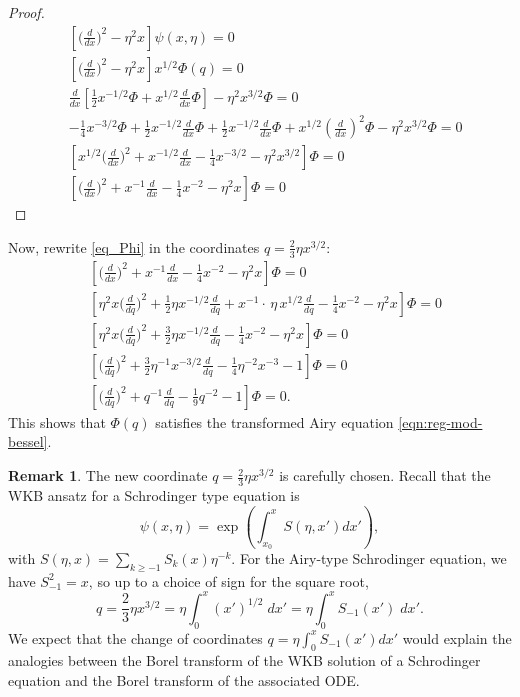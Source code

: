 \documentclass{article}
\theoremstyle{definition}
\newtheorem{remark}[definition]{Remark}
\theoremstyle{plain}
\begin{document}
\begin{proof}
\begin{align*}
&\left[\big(\tfrac{d}{dx}\big)^2 - \eta^2 x \right] \psi(x, \eta) = 0\\
&\left[\big(\tfrac{d}{dx}\big)^2 - \eta^2 x \right] x^{1/2}\Phi(q) = 0\\
&\frac{d}{dx}\left[\tfrac{1}{2}x^{-1/2}\Phi+x^{1/2}\tfrac{d}{dx}\Phi\right]-\eta^2x^{3/2}\Phi=0\\
&-\tfrac{1}{4}x^{-3/2}\Phi+\tfrac{1}{2}x^{-1/2}\tfrac{d}{dx}\Phi+\tfrac{1}{2}x^{-1/2}\tfrac{d}{dx}\Phi+x^{1/2}\left(\tfrac{d}{dx}\right)^2\Phi-\eta^2x^{3/2}\Phi=0\\
&\left[x^{1/2}\big(\tfrac{d}{dx}\big)^2+x^{-1/2}\tfrac{d}{dx}-\tfrac{1}{4}x^{-3/2}-\eta^2x^{3/2}\right]\Phi=0\\
&\left[\big(\tfrac{d}{dx}\big)^2+x^{-1}\tfrac{d}{dx}-\tfrac{1}{4}x^{-2}-\eta^2x\right]\Phi=0
\end{align*}
\end{proof}
Now, rewrite \eqref{eq_Phi} in the coordinates $q=\frac{2}{3}\eta x^{3/2}$: 
\begin{align*}
&\left[\big(\tfrac{d}{dx}\big)^2+x^{-1}\tfrac{d}{dx}-\tfrac{1}{4}x^{-2}-\eta^2x\right]\Phi=0\\
&\left[\eta^2x\big(\tfrac{d}{dq}\big)^2+\frac{1}{2}\eta x^{-1/2}\tfrac{d}{dq}+x^{-1}\cdot\, \eta\,  x^{1/2}\tfrac{d}{dq}-\tfrac{1}{4}x^{-2}-\eta^2x\right]\Phi=0\\
&\left[\eta^2x\big(\tfrac{d}{dq}\big)^2+\tfrac{3}{2}\eta x^{-1/2}\tfrac{d}{dq}-\tfrac{1}{4}x^{-2}-\eta^2x\right]\Phi=0\\
&\left[\big(\tfrac{d}{dq}\big)^2+\tfrac{3}{2}\eta^{-1} x^{-3/2}\tfrac{d}{dq}-\tfrac{1}{4}\eta^{-2}x^{-3}-1\right]\Phi=0\\
&\left[\big(\tfrac{d}{dq}\big)^2+q^{-1}\tfrac{d}{dq}-\tfrac{1}{9}q^{-2}-1\right]\Phi=0.
\end{align*}
This shows that $\Phi(q)$ satisfies the transformed Airy equation \eqref{eqn:reg-mod-bessel}. 

\begin{remark}
The new coordinate $q = \frac{2}{3}\eta x^{3/2}$ is carefully chosen. Recall that the WKB ansatz for a Schrodinger type equation is
\begin{equation}
\psi(x,\eta) = \exp\left(\int_{x_0}^xS(\eta,x')dx'\right),
\end{equation}
with $S(\eta,x)=\sum_{k\geq -1}S_k(x)\eta^{-k}$. For the Airy-type Schrodinger equation, we have $S_{-1}^2 = x$, so up to a choice of sign for the square root,
\[ q = \frac{2}{3}\eta x^{3/2}=\eta\int_0^x (x')^{1/2}\;dx' = \eta\int_{0}^x S_{-1}(x')\;dx'. \]
We expect that the change of coordinates $q=\eta\int_0^{x}S_{-1}(x')dx'$ would explain the analogies between the Borel transform of the WKB solution of a Schrodinger equation and the Borel transform of the associated ODE.  
\end{remark} 
%
\end{document}

